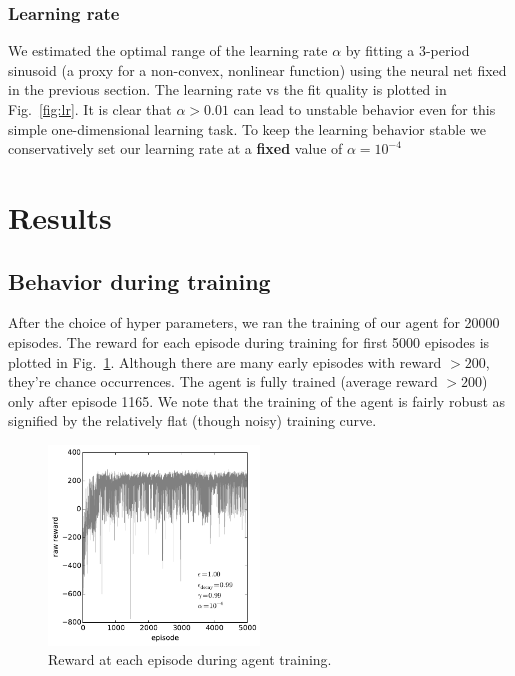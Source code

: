 \documentclass[conference]{IEEEtran}
\begin{document}
\subsubsection{Learning rate}
We estimated the optimal range of the learning rate $\alpha$ by fitting a 3-period sinusoid (a proxy for a non-convex, nonlinear function) using the neural net fixed in the previous section. The learning rate vs the fit quality is plotted in Fig.~\ref{fig:lr}. It is clear that $\alpha>0.01$ can lead to unstable behavior even for this simple one-dimensional learning task. To keep the learning behavior stable we conservatively set our learning rate at a {\bf fixed } value of $\alpha = 10^{-4}$
\section{Results}
\subsection{Behavior during training}
After the choice of hyper parameters, we ran the training of our agent for 20000 episodes. The reward for each episode during training for first 5000 episodes is plotted in Fig.~\ref{fig:fig1}. Although there are many early episodes with reward $>200$, they're chance occurrences. The agent is fully trained (average reward $>200$) only after episode 1165. We note that the training of the agent is fairly robust as signified by the relatively flat (though noisy) training curve.
\begin{figure}[tbp]
    \centering
    \includegraphics[width=0.5\textwidth]{./figures/fig1.pdf}
    \caption{Reward at each episode during agent training. \label{fig:fig1}}
\end{figure}
\end{document}
